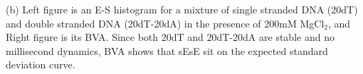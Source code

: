 \label{fig:bva_static}(b) Left figure is an E-S histogram for a mixture of single stranded DNA (20dT) and double stranded DNA (20dT-20dA) in the presence of 200mM MgCl$_2$, and Right figure is its BVA. Since both 20dT and 20dT-20dA are stable and no millisecond dynamics, BVA shows that sEsE sit on the expected standard deviation curve.